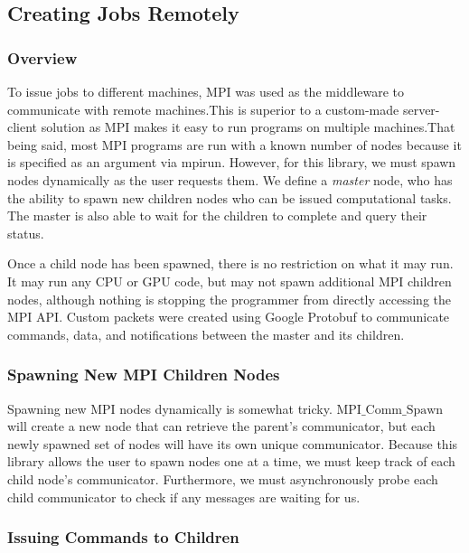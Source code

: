 \documentclass[11pt]{article}
\begin{document}
            
        \subsection{Creating Jobs Remotely}
            \subsubsection{Overview}    
                To issue jobs to different machines, MPI was used as the middleware to communicate with remote
                machines.This is superior to a custom-made server-client solution as MPI makes it easy to run programs
                on multiple machines.That being said, most MPI programs are run with a known number of nodes because
                it is specified as an argument via mpirun. However, for this library, we must spawn nodes dynamically
                as the user requests them. We define a \textit{master} node, who has the ability to spawn new children
                nodes who can be issued computational tasks. The master is also able to wait for the children to
                complete and query their status. 
                
                Once a child node has been spawned, there is no restriction on what it may run. It may run any CPU or
                GPU code, but may not spawn additional MPI children nodes, although nothing is stopping the programmer
                from directly accessing the MPI API. Custom packets were created using Google Protobuf to communicate
                commands, data, and notifications between the master and its children.
                 
            \subsubsection{Spawning New MPI Children Nodes}
                Spawning new MPI nodes dynamically is somewhat tricky. $\text{MPI\_Comm\_Spawn}$ will create a new
                node that can retrieve the parent's communicator, but each newly spawned set of nodes will have its
                own unique communicator. Because this library allows the user to spawn nodes one at a time, we must
                keep track of each child node's communicator. Furthermore, we must asynchronously probe each child
                communicator to check if any messages are waiting for us.
            
            \subsubsection{Issuing Commands to Children}
                
\end{document}
